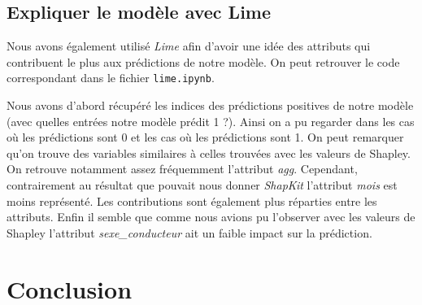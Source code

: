 \documentclass{article}
\begin{document}
    \subsection{Expliquer le modèle avec Lime}
    Nous avons également utilisé \textit{Lime} afin d'avoir une idée des attributs qui contribuent
    le plus aux prédictions de notre modèle. On peut retrouver le code correspondant dans le fichier 
    \texttt{lime.ipynb}.

    Nous avons d'abord récupéré les indices des prédictions positives de notre modèle (avec quelles 
    entrées notre modèle prédit 1 ?). Ainsi on a pu regarder dans les cas où les prédictions sont 0 
    et les cas où les prédictions sont 1.
    On peut remarquer qu'on trouve des variables similaires à celles trouvées avec les valeurs de 
    Shapley. On retrouve notamment assez fréquemment l'attribut \textit{agg}.
    Cependant, contrairement au résultat que pouvait nous donner \textit{ShapKit} l'attribut \textit{mois} est 
    moins représenté. Les contributions sont également plus réparties entre les attributs.
    Enfin il semble que comme nous avions pu l'observer avec les valeurs de Shapley l'attribut 
    \textit{sexe\_conducteur} ait un faible impact sur la prédiction.

    \section{Conclusion}


    \newpage
    \appendix
\end{document}
